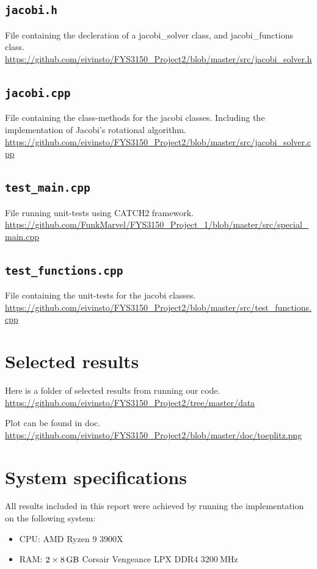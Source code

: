 \documentclass[reprint,english,notitlepage]{revtex4-1}  %
\begin{document}
\cprotect\subsection{\verb+jacobi.h+} \label{A.4}
File containing the decleration of a jacobi\_solver class, and jacobi\_functions class.
\url{https://github.com/eivinsto/FYS3150_Project2/blob/master/src/jacobi_solver.h}

\cprotect\subsection{\verb+jacobi.cpp+} \label{A.5}
File containing the class-methods for the jacobi classes. Including the implementation of Jacobi's rotational algorithm.
\url{https://github.com/eivinsto/FYS3150_Project2/blob/master/src/jacobi_solver.cpp}

\cprotect\subsection{\verb+test_main.cpp+} \label{A.6}
File running unit-tests using CATCH2 framework.
\url{https://github.com/FunkMarvel/FYS3150_Project_1/blob/master/src/special_main.cpp}

\cprotect\subsection{\verb+test_functions.cpp+} \label{A.7}
File containing the unit-tests for the jacobi classes.
\url{https://github.com/eivinsto/FYS3150_Project2/blob/master/src/test_functions.cpp}

\section{Selected results} \label{B}
Here is a folder of selected results from running our code.
\url{https://github.com/eivinsto/FYS3150_Project2/tree/master/data}

Plot can be found in doc.
\url{https://github.com/eivinsto/FYS3150_Project2/blob/master/doc/toeplitz.png}

\section{System specifications} \label{C}
All results included in this report were achieved by running the implementation on the following system:
\begin{itemize}
	\item CPU: AMD Ryzen \(9\) \(3900\)X
	\item RAM: \(2\times\SI{8}{\giga\byte}\) Corsair Vengeance LPX DDR\(4\) \(\SI{3200}{\mega\hertz}\)
\end{itemize}
\end{document}
